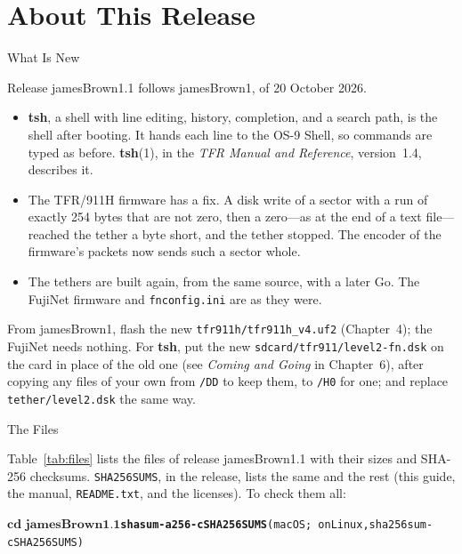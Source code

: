 \documentclass[10pt,twoside,openany]{book}
\makeatletter
\newcommand{\release}{jamesBrown1.1}
\newcommand{\cmd}[1]{\textbf{#1}}            %
\newcommand{\file}[1]{\texttt{#1}}           %
\newcommand{\rp}[2]{\textbf{#1}(#2)}         %
\newenvironment{ex}{\par\vspace{0.3ex}\small\begin{alltt}}{\end{alltt}\vspace{0.3ex}}
\newcommand{\thesectname}{}
\newcommand{\chapterpages}{%
  \renewcommand{\thepage}{\thechapter--\arabic{page}}\setcounter{page}{1}}
\renewcommand{\section}{\@startsection{section}{1}{0pt}{3.2ex plus 1ex}{1.2ex}%
  {\sffamily\bfseries\large}}
\makeatother
\begin{document}
\clearpage
\appendix
\chapter{About This Release}
\chapterpages
\renewcommand{\thesectname}{About This Release}

\section{What Is New}

Release \release{} follows jamesBrown1, of 20 October 2026.

\begin{itemize}\setlength{\itemsep}{0.4ex}
\item \cmd{tsh}, a shell with line editing, history, completion, and a
search path, is the shell after booting. It hands each line to the OS-9
Shell, so commands are typed as before. \rp{tsh}{1}, in the \emph{TFR
Manual and Reference}, version~1.4, describes it.
\item The TFR/911H firmware has a fix. A disk write of a sector with a
run of exactly 254 bytes that are not zero, then a zero---as at the end of
a text file---reached the tether a byte short, and the tether stopped. The
encoder of the firmware's packets now sends such a sector whole.
\item The tethers are built again, from the same source, with a later
Go. The FujiNet firmware and \file{fnconfig.ini} are as they were.
\end{itemize}

From jamesBrown1, flash the new \file{tfr911h/tfr911h\_v4.uf2}
(Chapter~4); the FujiNet needs nothing. For \cmd{tsh}, put the new
\file{sdcard/tfr911/level2-fn.dsk} on the card in place of the old one
(see \emph{Coming and Going} in Chapter~6), after copying any files of
your own from \file{/DD} to keep them, to \file{/H0} for one; and
replace \file{tether/level2.dsk} the same way.

\section{The Files}

Table~\ref{tab:files} lists the files of release \release{} with their
sizes and SHA-256 checksums. \file{SHA256SUMS}, in the release, lists the
same and the rest (this guide, the manual, \file{README.txt}, and the
licenses). To check them all:
\begin{ex}
$ \textbf{cd \release}
$ \textbf{shasum -a 256 -c SHA256SUMS}          \textrm{\small (macOS;\ on Linux, sha256sum -c SHA256SUMS)}
\end{ex}
\end{document}
